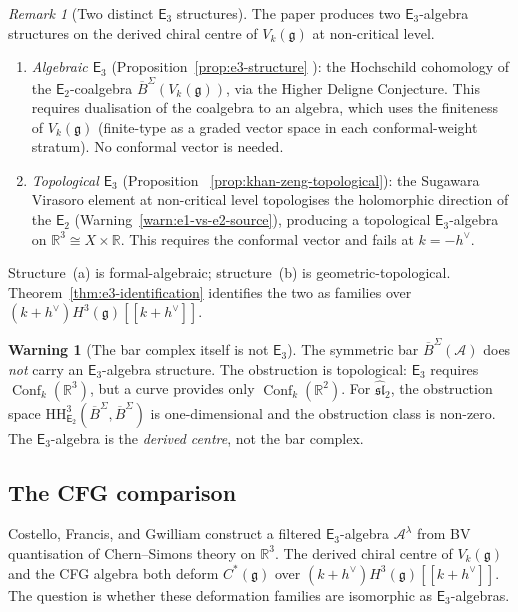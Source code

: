\documentclass[11pt,reqno]{amsart}
\theoremstyle{definition}
\newtheorem{warning}[theorem]{Warning}
\theoremstyle{remark}
\newtheorem{remark}[theorem]{Remark}
\newcommand{\cA}{\mathcal{A}}
\newcommand{\HH}{\mathrm{HH}}
\newcommand{\Etwo}{\mathsf{E}_{2}}
\newcommand{\Ethree}{\mathsf{E}_{3}}
\DeclareMathOperator{\Conf}{Conf}
\newcommand{\fg}{\mathfrak{g}}
\newcommand{\BarSig}{\overline{B}^{\Sigma}}
\newcommand{\RR}{\mathbb{R}}
\numberwithin{equation}{section}
\begin{document}
\begin{remark}[Two distinct $\Ethree$ structures]
\label{rem:two-e3}
The paper produces two $\Ethree$-algebra structures on
the derived chiral centre of $V_k(\fg)$ at non-critical
level.
\begin{enumerate}[label=\textup{(\alph*)}]
\item \emph{Algebraic $\Ethree$}
  \textup{(}Proposition~\textup{\ref{prop:e3-structure}}%
  \textup{)}: the Hochschild cohomology of the
  $\Etwo$-coalgebra $\BarSig(V_k(\fg))$, via the Higher
  Deligne Conjecture. This requires dualisation of the
  coalgebra to an algebra, which uses the finiteness of
  $V_k(\fg)$ \textup{(}finite-type as a graded vector space
  in each conformal-weight stratum\textup{)}. No conformal
  vector is needed.
\item \emph{Topological $\Ethree$}
  \textup{(}Proposition~%
  \textup{\ref{prop:khan-zeng-topological}}\textup{)}:
  the Sugawara Virasoro element at non-critical level
  topologises the holomorphic direction of the
  $\Etwo$ (Warning~\ref{warn:e1-vs-e2-source}), producing a topological
  $\Ethree$-algebra on $\RR^3 \cong X \times \RR$.
  This requires the conformal vector and fails at
  $k = -h^\vee$.
\end{enumerate}
Structure~\textup{(a)} is formal-algebraic;
structure~\textup{(b)} is geometric-topological.
Theorem~\textup{\ref{thm:e3-identification}} identifies
the two as families over $(k+h^\vee) H^3(\fg)[[k+h^\vee]]$.
\end{remark}

\begin{warning}[The bar complex itself is not $\Ethree$]
\label{warn:bar-not-e3}
The symmetric bar $\BarSig(\cA)$ does \emph{not} carry
an $\Ethree$-algebra structure. The obstruction is
topological: $\Ethree$ requires $\Conf_k(\RR^3)$, but a
curve provides only $\Conf_k(\RR^2)$. For
$\widehat{\mathfrak{sl}}_2$, the obstruction space
$\HH^3_{\Etwo}(\BarSig, \BarSig)$ is one-dimensional
and the obstruction class is non-zero. The
$\Ethree$-algebra is the \emph{derived centre}, not the
bar complex.
\end{warning}


\subsection{The CFG comparison}
\label{subsec:cfg}

Costello, Francis, and Gwilliam construct a filtered
$\Ethree$-algebra $\cA^\lambda$ from BV quantisation of
Chern--Simons theory on $\RR^3$. The derived chiral centre
of $V_k(\fg)$ and the CFG algebra both deform $C^*(\fg)$
over $(k+h^\vee) H^3(\fg)[[k+h^\vee]]$. The question is whether
these deformation families are isomorphic as
$\Ethree$-algebras.
\end{document}
